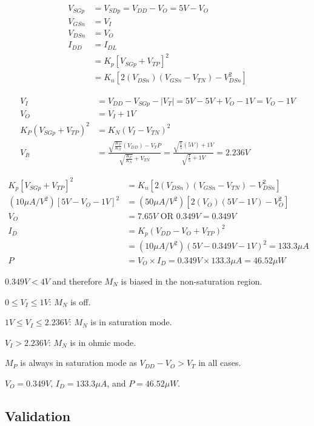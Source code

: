 \documentclass[12pt,letterpaper,titlepage]{article}
\begin{document}
\begin{raggedright}
\begin{paracol}{2}
\begin{align*}
   V_{SGp}
   &= V_{SDp}
    = V_{DD} - V_O
    = 5V - V_O
\\ V_{GSn}
   &= V_I
\\ V_{DSn}
   &= V_O
\\ I_{DD} 
   &= I_{DL}
\\ &= K_p[V_{SGp} + V_{TP}]^2
\\ &= K_n[2(V_{DSn})(V_{GSn}-V_{TN})-V_{DSn}^2]
\end{align*}
\end{paracol}

\begin{align*}
   V_I
   &= V_{DD} - V_{SGp} - |V_T|
    = 5V - 5V + V_O - 1V
    = V_O - 1V
\\ V_O
   &= V_I + 1V
\\ K_P(V_{SGp} + V_{TP})^2 
   &= K_N(V_I - V_{TN})^2
\\ V_{It}
   &= \frac{\sqrt{\frac{K_P}{K_N}}(V_{DD}) - V_TP}{\sqrt{\frac{K_P}{K_N}} + V_{TN}}
   = \frac{\sqrt{\frac{1}{5}}(5V) + 1V}{\sqrt{\frac{1}{5}} + 1V}
   = 2.236V
\end{align*}

\begin{align*}
K_p[V_{SGp} + V_{TP}]^2
   &= K_n[2(V_{DSn})(V_{GSn}-V_{TN})-V_{DSn}^2]
\\ (10\mu A/V^2)[5V - V_O - 1V]^2 
&= (50\mu A/V^2)[2(V_O)(5V-1V)-V_O^2]
\\ V_O
   &= 7.65V \text{ OR } 0.349V
    = 0.349V
\\ I_D
   &= K_p (V_{DD} - V_O + V_{TP})^2
\\ &= (10\mu A/V^2) (5V - 0.349V - 1V)^2
    = 133.3\mu A
\\ P
   &= V_O \times I_D
    = 0.349V \times 133.3\mu A
    = 46.52\mu W
\end{align*}

$0.349V < 4V$ and therefore $M_N$ is biased in the non-saturation region.

$0 \leq V_I \leq 1V$: $M_N$ is off.

$1V \leq V_I \leq 2.236V$: $M_N$ is in saturation mode. 

$V_I > 2.236V$: $M_N$ is in ohmic mode.

$M_P$ is always in saturation mode as $V_{DD} - V_O > V_T$ in all cases.

$V_O = 0.349V$, $I_D = 133.3\mu A$, and $P = 46.52\mu W$.
\clearpage
\subsection{Validation}


\end{raggedright}
\end{document}
